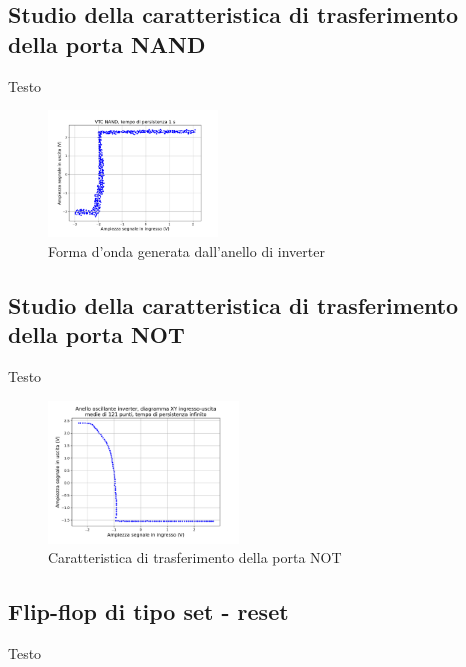 \documentclass[journal]{IEEEtran}
\begin{document}
\subsection{Studio della caratteristica di trasferimento della porta NAND}
Testo

\begin{figure}[H]%
\begin{center}
\includegraphics[width=0.40\textwidth]{analysis/output/NAND-XY.pdf}
\caption{Forma d'onda generata dall'anello di inverter}
\label{fig:graph_ring_oscillator}
\end{center}
\end{figure}


\subsection{Studio della caratteristica di trasferimento della porta NOT}
Testo

\begin{figure}[H]%
\begin{center}
\includegraphics[width=0.45\textwidth]{analysis/output/inverter_ring_xy.pdf}
\caption{Caratteristica di trasferimento della porta NOT}
\label{fig:inverter_ring_xy}
\end{center}
\end{figure}


\subsection{Flip-flop di tipo set - reset}
Testo
\end{document}

